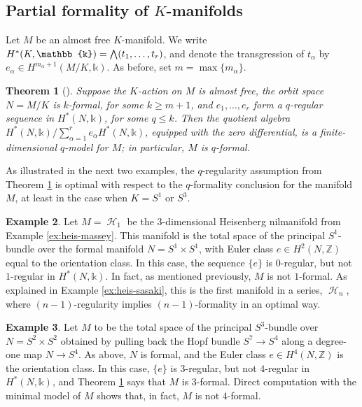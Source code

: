 \documentclass{article}
\numberwithin{equation}{section}
\newtheorem{theorem}{Theorem}[section]
\theoremstyle{definition}
\newtheorem{example}[theorem]{Example}
\newcommand{\Z}{\mathbb{Z}}
\renewcommand{\k}{\mathbb{k}}
\DeclareMathOperator{\Heis}{\mathcal{H}}
\newcommand{\bwedge}{\mbox{\normalsize $\bigwedge$}}
\begin{document}
\subsection{Partial formality of $K$-manifolds}
\label{subsec:pfk}

Let $M$ be an almost free $K$-manifold. We 
write $H^{*}(K,\k)= \bwedge (t_1,\dots ,t_{r})$, 
and denote the transgression of $t_{\alpha}$ by 
$e_{\alpha} \in H^{m_{\alpha} +1} (M/K,\k)$.  As before, set 
$m= \max \{ m_{\alpha} \}$.

\begin{theorem}[\cite{PS-imrn19}]
\label{thm:nformal}
Suppose the $K$-action on $M$ is almost free, the orbit space $N=M/K$ is $k$-formal, 
for some $k\ge m+1$, and $e_1,\dots ,e_r$ form a $q$-regular sequence in $H^{*}(N,\k)$,
for some $q\le k$.  Then the quotient algebra 
$H^{*}(N,\k) /\sum_{\alpha=1}^r e_{\alpha} H^{*}(N,\k)$, 
equipped with the zero differential,  
is a finite-dimensional $q$-model for $M$; in particular, 
$M$ is $q$-formal.
\end{theorem}

As illustrated in the next two examples, the $q$-regularity 
assumption from Theorem \ref{thm:nformal} is
optimal with respect to the $q$-formality conclusion for 
the manifold $M$, at least in the case when $K=S^1$ or $S^3$. 

\begin{example}
\label{ex:heis-again}
Let $M=\Heis_1$ be the $3$-dimensional Heisenberg nilmanifold 
from Example \ref{ex:heis-massey}.  This manifold is the total space of the 
principal $S^1$-bundle over the formal manifold $N=S^1 \times S^1$, 
with Euler class $e\in H^2 (N,\Z)$ equal to the orientation class. 
In this case, the sequence $\{ e \}$ is $0$-regular, but not $1$-regular
in $H^{*} (N,\k)$. In fact, as mentioned previously, $M$ is not $1$-formal. 
As explained in Example \ref{ex:heis-sasaki}, this is the first manifold in a series, 
$\Heis_n$, where $(n-1)$-regularity implies $(n-1)$-formality in an optimal way. 
\end{example}

\begin{example}
\label{ex:hopf-nonformal}
Let  $M$ to be the total 
space of the principal $S^3$-bundle over $N=S^2 \times S^2$ 
obtained by pulling back the Hopf bundle $S^7\to S^4$ along 
a degree-one map $N\to S^4$. As above, $N$ is 
formal, and the Euler class $e\in H^4 (N,\Z)$ 
is the orientation class.  In this case, $\{ e \}$ is 
$3$-regular, but not $4$-regular 
in $H^{*} (N,\k)$, and Theorem \ref{thm:nformal} 
says that $M$ is $3$-formal. Direct computation with the 
minimal model of $M$ shows that, in fact, $M$ is 
not $4$-formal.
\end{example}
\end{document}
